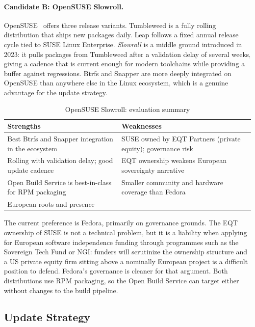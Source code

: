 \paragraph{Candidate B: OpenSUSE Slowroll.}
OpenSUSE~\cite{opensuse} offers three release variants.
Tumbleweed is a fully rolling distribution that ships new packages daily. Leap
follows a fixed annual release cycle tied to SUSE Linux Enterprise. \emph{Slowroll}
is a middle ground introduced in 2023: it pulls packages from Tumbleweed after a
validation delay of several weeks, giving a cadence that is current enough for
modern toolchains while providing a buffer against regressions. Btrfs and Snapper
are more deeply integrated on OpenSUSE than anywhere else in the Linux ecosystem,
which is a genuine advantage for the update strategy.

\begin{table}[htbp]
\caption{OpenSUSE Slowroll: evaluation summary}
\label{tab:slowroll}
\begin{tabularx}{\linewidth}{XX}
\toprule
\textbf{Strengths} & \textbf{Weaknesses} \\
\midrule
Best Btrfs and Snapper integration in the ecosystem &
  SUSE owned by EQT Partners (private equity); governance risk \\
Rolling with validation delay; good update cadence &
  EQT ownership weakens European sovereignty narrative \\
Open Build Service is best-in-class for RPM packaging &
  Smaller community and hardware coverage than Fedora \\
European roots and presence & \\
\bottomrule
\end{tabularx}
\end{table}

The current preference is Fedora, primarily on governance grounds. The EQT
ownership of SUSE is not a technical problem, but it is a liability when
applying for European software independence funding through programmes such as
the Sovereign Tech Fund or NGI: funders will scrutinize the ownership structure
and a US private equity firm sitting above a nominally European project is a
difficult position to defend. Fedora's governance is cleaner for that argument.
Both distributions use RPM packaging, so the Open Build Service can target
either without changes to the build pipeline.

\subsection{Update Strategy}
\label{sec:updates}

